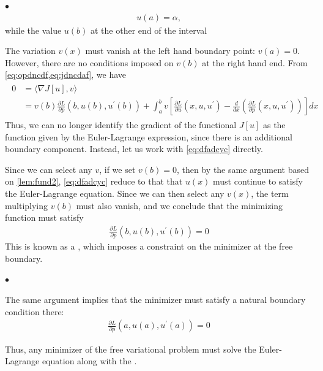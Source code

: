 \documentclass{article}
\begin{document}
$\bullet$ 
\begin{align}
u(a)=\alpha, \label{eq:fixed_a}
\end{align}
while the value $u(b)$ at the other end of the interval 

The variation $v(x)$ must vanish at the left hand boundary point: $v(a)=0 .$ However, there are no conditions imposed on $v(b)$ at the right hand end. From  \cref{eq:opdncdf,eq:jdncdaf}, we have 
\begin{align}
\begin{aligned}
0 &=\langle\nabla J[u], v\rangle \\
&=v(b) \frac{\partial L}{\partial p}\left(b, u(b), u^{\prime}(b)\right)+\int_{a}^{b} v\left[\frac{\partial L}{\partial u}\left(x, u, u^{\prime}\right)-\frac{d}{d x}\left(\frac{\partial L}{\partial p}\left(x, u, u^{\prime}\right)\right)\right] d x \label{eq:dfadcyc}
\end{aligned}
\end{align}
Thus, we can no longer identify the gradient of the functional $J[u]$ as the function given by the Euler-Lagrange expression, since there is an additional boundary component. Instead, let us work with \cref{eq:dfadcyc} directly. 

Since we can select any $v$, if we set $v(b)=0$, then by the same argument based on \cref{lem:fund2},  \cref{eq:dfadcyc} reduce to that that $u(x)$ must continue to satisfy the Euler-Lagrange equation. Since we can then select any $v(x)$, the term multiplying $v(b)$ must also vanish, and we conclude that the minimizing function must satisfy
\begin{align}
\frac{\partial L}{\partial p}\left(b, u(b), u^{\prime}(b)\right)=0\label{eq:dcfdfaf1}
\end{align}
This is known as a , which imposes a constraint on the minimizer at the free boundary.

$\bullet$ 

The same argument implies that the minimizer must  satisfy a natural boundary condition there:
\begin{align}
\frac{\partial L}{\partial p}\left(a, u(a), u^{\prime}(a)\right)=0\label{eq:dcfdfaf2}
\end{align}

Thus, any minimizer of the free variational problem must solve the Euler-Lagrange equation along with the . 
\end{document}
